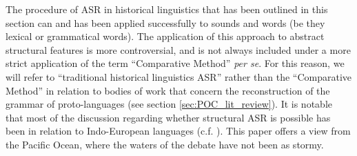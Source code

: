 \documentclass[12pt,letterpaper]{article}
\begin{document}
The procedure of ASR in historical linguistics that has been outlined in this section can and has been applied successfully to sounds and words (be they lexical or grammatical words). The application of this approach to abstract structural features is more controversial, and is not always included under a more strict application of the term ``Comparative Method'' \emph{per se}. For this reason, we will refer to ``traditional historical linguistics ASR'' rather than the ``Comparative Method'' in relation to bodies of work that concern the reconstruction of the grammar of proto-languages (see section \ref{sec:POC_lit_review}). It is notable that most of the discussion regarding whether structural ASR is possible has been in relation to Indo-European languages (c.f. \cite{walkden_2013}). This paper offers a view from the Pacific Ocean, where the waters of the debate have not been as stormy.








\end{document}
